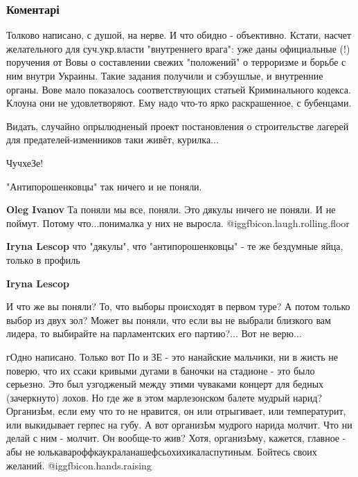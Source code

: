  
 
 
 
 
\subsubsection{Коментарі}

\begin{itemize} %

Толково написано, с душой, на нерве. И что обидно - объективно. Кстати, насчет
желательного для суч.укр.власти "внутреннего врага": уже даны официальные (!)
поручения от Вовы о составлении свежих "положений" о терроризме и борьбе с ним
внутри Украины. Такие задания получили и сэбэушлые, и внутренние органы. Вове
мало показалось соответствующих статьей Криминального кодекса. Клоуна они не
удовлетворяют. Ему надо что-то ярко раскрашенное, с бубенцами.

Видать, случайно опрылюдненый проект постановления о строительстве лагерей для предателей-изменников таки живёт, курилка...

ЧучхеЗе!

"Антипорошенковцы" так ничего и не поняли.

\begin{itemize} %
\textbf{Oleg Ivanov} Та поняли мы все, поняли. Это дякулы ничего не поняли. И не поймут. Потому что...понималка у них не выросла.  @igg{fbicon.laugh.rolling.floor} 

\textbf{Iryna Lescop} что "дякулы", что "антипорошенковцы" - те же бездумные яйца, только в профиль

\textbf{Iryna Lescop} 

И что же вы поняли? То, что выборы происходят в первом туре? А потом только выбор
из двух зол? Может вы поняли, что если вы не выбрали близкого вам лидера, то
выбирайте на парламентских его партию?... Вот не верю...

\end{itemize} %


гОдно написано. Только вот По и ЗЕ - это нанайские мальчики, ни в жисть не
поверю, что их ссаки кривыми дугами в баночки на стадионе - это было серьезно.
Это был узгодженый между этими чуваками концерт для бедных (зачеркнуто) лохов.
Но где же в этом марлезонском балете мудрый нарид? ОрганизЬм, если ему что то
не нравится, он или отрыгивает, или температурит, или выкидывает герпес на
губу. А вот организЬм мудрого нарида молчит. Что ни делай с ним - молчит. Он
вообще-то жив? Хотя, организЬму, кажется, главное - абы не
юлькавароффкаукраланашефсьохихикаласпутиным. Бойтесь своих желаний.  @igg{fbicon.hands.raising} 


\end{itemize}
